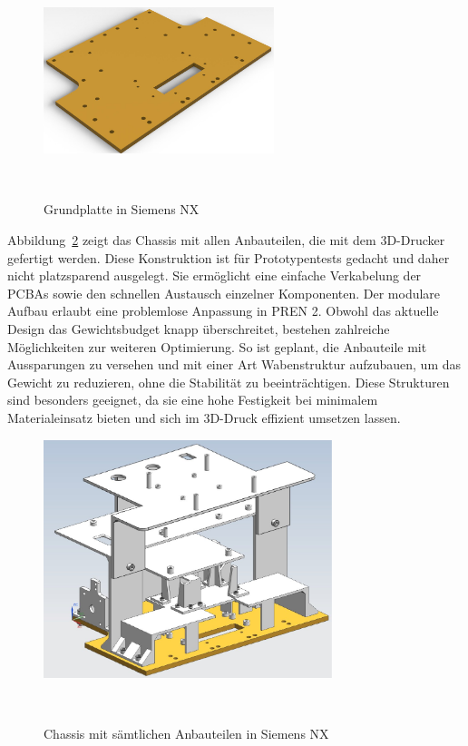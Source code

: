 \documentclass[main.tex]{subfiles} %
\begin{document}
\begin{figure}[H]
    \centering
    \includegraphics[width=0.6\textwidth]{Grundplatte.pdf}
    \caption{Grundplatte in Siemens NX}~\label{fig:Grundplatte}
\end{figure}

Abbildung~\ref{fig:Chassis_komplett} zeigt das Chassis mit allen Anbauteilen, die mit 
dem 3D-Drucker gefertigt werden. Diese Konstruktion ist für Prototypentests gedacht und daher nicht 
platzsparend ausgelegt. Sie ermöglicht eine einfache Verkabelung der PCBAs sowie den 
schnellen Austausch einzelner Komponenten. Der modulare Aufbau erlaubt eine 
problemlose Anpassung in PREN 2. Obwohl das aktuelle Design das Gewichtsbudget knapp 
überschreitet, bestehen zahlreiche Möglichkeiten zur weiteren Optimierung. So ist 
geplant, die Anbauteile mit Aussparungen zu versehen und mit einer Art Wabenstruktur 
aufzubauen, um das Gewicht 
zu reduzieren, ohne die Stabilität zu beeinträchtigen. Diese Strukturen sind 
besonders geeignet, da sie eine hohe Festigkeit bei minimalem Materialeinsatz bieten 
und sich im 3D-Druck effizient umsetzen lassen.

\begin{figure}[H]
    \centering
    \includegraphics[width=0.75\textwidth]{Chassis_komplett.pdf}
    \caption{Chassis mit sämtlichen Anbauteilen in Siemens NX}~\label{fig:Chassis_komplett}
\end{figure}
\end{document}
